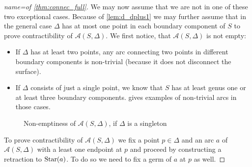 \begin{proof}[{name={of \autoref{thm:connec_full}}}]
	We may now assume that we are not in one of these two exceptional cases.
	Because of \autoref{lem:d_dplus1} we may further assume that in the general case $\Delta$ has at most one point in each boundary component of $S$ to prove contractibility of $\mathcal{A}(S,\Delta)$. 
	We first notice, that $\mathcal{A}(S,\Delta)$ is not empty: 
	\begin{itemize}
		\item If $\Delta$ has at least two points, any arc connecting two points in different boundary components is non-trivial (because it does not disconnect the surface).
		\item If $\Delta$ consists of just a single point, we know that $S$ has at least genus one or at least three boundary components.
		 gives examples of non-trivial arcs in those cases.
	\end{itemize}
	\begin{figure}[htb]
		\centering
		\caption{Non-emptiness of $\mathcal{A}(S,\Delta)$, if $\Delta$ is a singleton}\label{fig:non-empty-delta-one}
	\end{figure}
	To prove contractibility of $\mathcal{A}(S,\Delta)$ we fix a point $p \in \Delta$ and an arc $a$ of $\mathcal{A}(S,\Delta)$ with a least one endpoint at $p$ and proceed by
	constructing a retraction to $\operatorname{Star}(a)$.
	To do so we need to fix a germ of $a$ at $p$ as well.
	

\end{proof}
